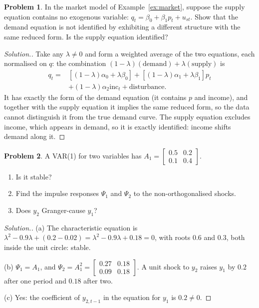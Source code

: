 \documentclass[11pt,a4paper]{article}
\numberwithin{equation}{section}
\theoremstyle{definition}
\newtheorem{problemx}{Problem}[subsection]
\newenvironment{problem}{\begin{problemx}}{\end{problemx}}
\newenvironment{solution}
  {\renewcommand{\qedsymbol}{}\begin{proof}[\textit{Solution}.]}
  {\end{proof}}
\begin{document}
\begin{problem}
In the market model of Example~\ref{ex:market}, suppose the supply equation contains no exogenous variable: $q_t = \beta_0 + \beta_1p_t + u_{st}$. Show that the demand
equation is not identified by exhibiting a different structure with the same reduced form. Is the supply equation identified?
\end{problem}

\begin{solution}
Take any $\lambda \neq 0$ and form a weighted average of the two equations, each normalised on $q$: the combination
$(1 - \lambda)(\text{demand}) + \lambda(\text{supply})$ is
\begin{align*}
q_t = {}&[(1 - \lambda)\alpha_0 + \lambda\beta_0] + [(1 - \lambda)\alpha_1 + \lambda\beta_1]p_t\\
&+ (1 - \lambda)\alpha_2\text{inc}_t + \text{disturbance}.
\end{align*}
It has exactly the form of the demand
equation (it contains $p$ and income), and together with the supply equation it implies the same reduced form, so the data cannot distinguish it from
the true demand curve. The supply equation excludes income, which appears in demand, so it is exactly identified: income shifts demand along it.
\end{solution}

\begin{problem}
A VAR(1) for two variables has $A_1 = \begin{bmatrix} 0.5 & 0.2\\ 0.1 & 0.4\end{bmatrix}$.
\begin{enumerate}[label=(\alph*)]
\item Is it stable?
\item Find the impulse responses $\Psi_1$ and $\Psi_2$ to the non-orthogonalised shocks.
\item Does $y_2$ Granger-cause $y_1$?
\end{enumerate}
\end{problem}

\begin{solution}
(a) The characteristic equation is $\lambda^2 - 0.9\lambda + (0.2 - 0.02) = \lambda^2 - 0.9\lambda + 0.18 = 0$, with roots $0.6$ and $0.3$, both inside the unit circle: stable.

(b) $\Psi_1 = A_1$, and $\Psi_2 = A_1^2 = \begin{bmatrix} 0.27 & 0.18\\ 0.09 & 0.18\end{bmatrix}$. A unit shock to $y_2$ raises $y_1$ by $0.2$ after one period and $0.18$ after two.

(c) Yes: the coefficient of $y_{2,t-1}$ in the equation for $y_1$ is $0.2 \neq 0$.
\end{solution}
\end{document}
